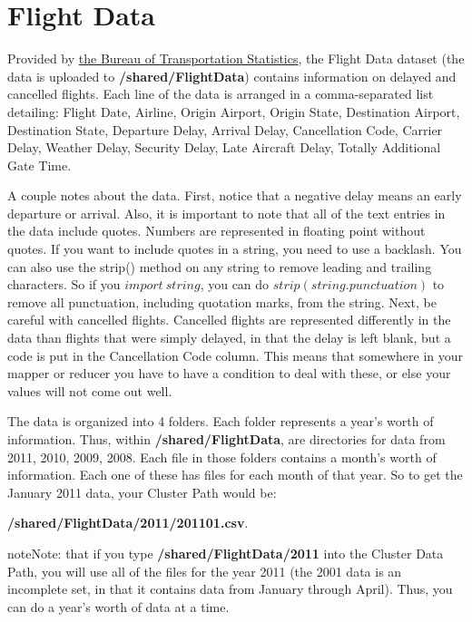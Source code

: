 \documentclass[letterpaper,10pt,openany,oneside]{sphinxmanual}
\begin{document}
\section{Flight Data}
\label{WmrActivities/WmrActivities:flight-data}
Provided by
\href{http://www.transtats.bts.gov/DL\_SelectFields.asp?Table\_ID=236\&DB\_Short\_Name=On-Time}{the Bureau of Transportation Statistics},
the Flight Data dataset (the data is uploaded to \textbf{/shared/FlightData}) contains information on delayed and
cancelled flights. Each line of the data is arranged in a
comma-separated list detailing: Flight Date, Airline, Origin
Airport, Origin State, Destination Airport, Destination State,
Departure Delay, Arrival Delay, Cancellation Code, Carrier Delay,
Weather Delay, Security Delay, Late Aircraft Delay, Totally
Additional Gate Time.

A couple notes about the data. First, notice that a negative delay
means an early departure or arrival. Also, it is important to note
that all of the text entries in the data include quotes. Numbers
are represented in floating point without quotes. If you want to
include quotes in a string, you need to use a backlash. You can
also use the strip() method on any string to remove leading and
trailing characters. So if you $import \ string$, you can
do $strip(string.punctuation)$ to remove all punctuation,
including quotation marks, from the string. Next, be careful with
cancelled flights. Cancelled flights are represented differently in
the data than flights that were simply delayed, in that the delay
is left blank, but a code is put in the Cancellation Code column.
This means that somewhere in your mapper or reducer you have to
have a condition to deal with these, or else your values will not
come out well.

The data is organized into 4 folders. Each folder represents a
year's worth of information. Thus, within \textbf{/shared/FlightData}, are directories for
data from 2011, 2010, 2009, 2008. Each file in those folders
contains a month's worth of information. Each one of these has
files for each month of that year. So to get the January 2011 data,
your Cluster Path would be:

\textbf{/shared/FlightData/2011/201101.csv}.

\begin{notice}{note}{Note:}
that if you type
\textbf{/shared/FlightData/2011}
into the Cluster Data Path, you will use all of the files for the
year 2011 (the 2001 data is an incomplete set, in that it contains
data from January through April). Thus, you can do a year's worth
of data at a time.
\end{notice}
\end{document}
